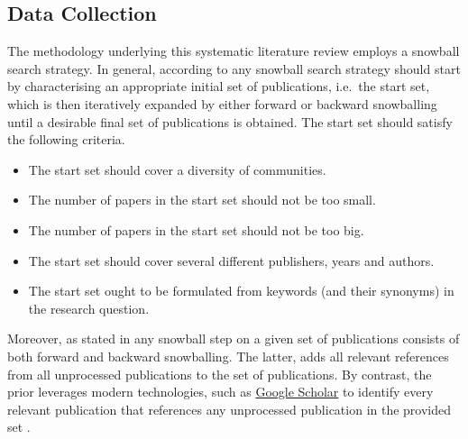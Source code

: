 \documentclass[11pt,a4paper]{book}
\theoremstyle{definition}
\theoremstyle{definition}
\theoremstyle{definition}
\theoremstyle{remark}
\begin{document}
\subsection{Data Collection}
\label{subsec:data_collection}
The methodology underlying this systematic literature review employs a snowball search strategy. 
In general, according to \parencite{wohlin2014guidelines} any snowball search strategy should start by characterising an appropriate initial set of publications, i.e.\ the start set, which is then iteratively expanded by either forward or backward snowballing until a desirable final set of publications is obtained.
The start set should satisfy the following criteria.
\begin{itemize}
\item The start set should cover a diversity of communities.
\item The number of papers in the start set should not be too small.
\item The number of papers in the start set should not be too big.
\item The start set should cover several different publishers, years and authors.
\item The start set ought to be formulated from keywords (and their synonyms) in the research question.
\end{itemize}
Moreover, as stated in \parencite{wohlin2014guidelines} any snowball step on a given set of publications consists of both forward and backward snowballing.
The latter, adds all relevant references from all unprocessed publications to the set of publications. By contrast, the prior leverages modern technologies, such as \href{https://scholar.google.at/}{Google Scholar} to identify every relevant publication that references any unprocessed publication in the provided set \parencite{wohlin2014guidelines}.
\end{document}
